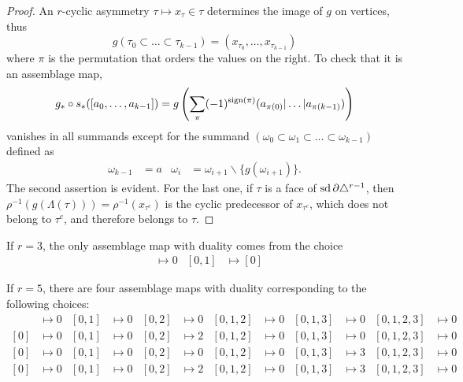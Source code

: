 \begin{proof}
	An $r$-cyclic asymmetry $\tau\mapsto x_{\tau}\in \tau$ determines the image of $g$ on vertices, thus
	\[
	g(\tau_0\subset\dots\subset\tau_{k-1}) = (x_{\tau_0},\dots,x_{\tau_{k-1}})
	\]
	where $\pi$ is the permutation that orders the values on the right. To check that it is an assemblage map,
	\[
	g_*\circ s_*([a_0,\dots,a_{k-1}]) = g\left(\sum_{\pi} (-1)^{\operatorname{sign}(\pi)} (a_{\pi(0)}|\dots|a_{\pi(k-1)})\right)
	\]
	vanishes in all summands except for the summand $(\omega_0 \subset \omega_1 \subset \dots \subset \omega_{k-1})$ defined as
	\begin{align*}
		\omega_{k-1} &= a
		&
		\omega_{i} &= \omega_{i+1}\smallsetminus \{g(\omega_{i+1})\}.
	\end{align*}
	The second assertion is evident. For the last one, if $\tau$ is a face of $\operatorname{sd} \partial \triangle^{r-1}$, then $\rho^{-1}(g(\Lambda(\tau))) = \rho^{-1}(x_{\tau^c})$ is the cyclic predecessor of $x_{\tau^c}$, which does not belong to $\tau^c$, and therefore belongs to $\tau$.
\end{proof}

\begin{example}
	If $r=3$, the only assemblage map with duality comes from the choice
	\begin{align*}
		[0]&\mapsto 0 & [0,1]&\mapsto [0]
	\end{align*}
\end{example}

\begin{example}\label{example:asymmetries5}
	If $r=5$, there are four assemblage maps with duality corresponding to the following choices:
	\begin{align*}
		[0]&\mapsto 0 & [0,1]&\mapsto 0 & [0,2]&\mapsto 0 & [0,1,2]&\mapsto 0 & [0,1,3] & \mapsto 0 & [0,1,2,3] & \mapsto 0 \\
		[0]&\mapsto 0 & [0,1]&\mapsto 0 & [0,2]&\mapsto 2 & [0,1,2]&\mapsto 0 & [0,1,3] & \mapsto 0 & [0,1,2,3] & \mapsto 0 \\
		[0]&\mapsto 0 & [0,1]&\mapsto 0 & [0,2]&\mapsto 0 & [0,1,2]&\mapsto 0 & [0,1,3] & \mapsto 3 & [0,1,2,3] & \mapsto 0 \\
		[0]&\mapsto 0 & [0,1]&\mapsto 0 & [0,2]&\mapsto 2 & [0,1,2]&\mapsto 0 & [0,1,3] & \mapsto 3 & [0,1,2,3] & \mapsto 0
	\end{align*}
\end{example}

